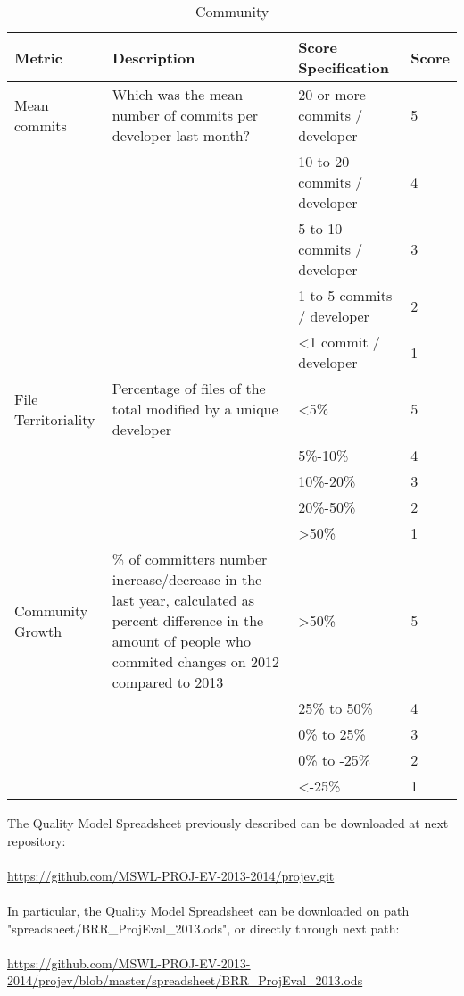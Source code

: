 \documentclass[11pt]{article}
\begin{document}
\begin{table}[H]
  \begin{center}
    \begin{tabular}{ | p{3cm} | p{5cm} | p{3cm} | l | }
    \toprule
    \textbf{Metric} & \textbf{Description} & \textbf{Score Specification} & \textbf{Score} \\
    \hline
    Mean commits & Which was the mean number of commits per developer last month? & 20 or more commits / developer & 5 \\ \cline{3-3} \cline{4-4}
    & & 10 to 20 commits / developer & 4 \\ \cline{3-3}\cline{4-4}
    & & 5 to 10 commits / developer & 3 \\ \cline{3-3}\cline{4-4}
    & & 1 to 5 commits / developer & 2 \\ \cline{3-3}\cline{4-4}
    & & \textless 1 commit / developer & 1 \\ 
    \hline
    File Territoriality & Percentage of files of the total modified by a unique developer & \textless 5\% & 5 \\ \cline{3-3} \cline{4-4}
    & & 5\%-10\%  & 4 \\ \cline{3-3}\cline{4-4}
    & & 10\%-20\% & 3 \\ \cline{3-3}\cline{4-4}
    & & 20\%-50\% & 2 \\ \cline{3-3}\cline{4-4}
    & & \textgreater 50\% & 1 \\ 
    \hline
    Community Growth & \% of committers number increase/decrease in the last year, calculated as percent difference in the amount of people who commited changes on 2012 compared to 2013 & \textgreater50\% & 5 \\ \cline{3-3} \cline{4-4}
    & & 25\% to 50\% & 4 \\ \cline{3-3}\cline{4-4}
    & & 0\% to 25\%  & 3 \\ \cline{3-3}\cline{4-4}
    & & 0\% to -25\% & 2 \\ \cline{3-3}\cline{4-4}
    & & \textless-25\%       & 1 \\ 
    \bottomrule
    \end{tabular}
    \caption{Community}
    \label{tab:community}
  \end{center}
\end{table}
The Quality Model Spreadsheet previously described can be downloaded at next repository:\\
\\
\url{https://github.com/MSWL-PROJ-EV-2013-2014/projev.git}\\
\\
In particular, the Quality Model Spreadsheet can be downloaded on path "spreadsheet/BRR\_ProjEval\_2013.ods", or directly through next path:\\
\\
\url{https://github.com/MSWL-PROJ-EV-2013-2014/projev/blob/master/spreadsheet/BRR_ProjEval_2013.ods}
\end{document}
